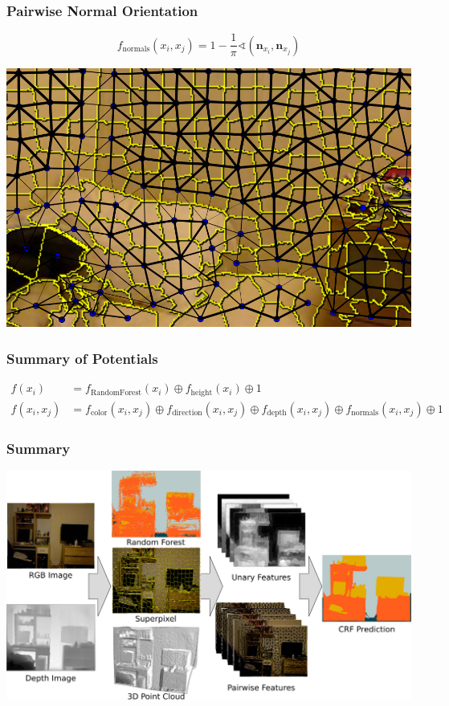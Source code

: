\documentclass[final,ignorenonframetext,compress]{beamer}
\begin{document}
    \begin{frame}
        \frametitle{Pairwise Normal Orientation}
        \[
            f_\text{normals}(x_i, x_j) = 1 - \frac{1}{\pi}\sphericalangle(\mathbf{n}_{x_i}, \mathbf{n}_{x_j})
         \]
        \begin{center}
            \includegraphics[width=.6\linewidth]{images/normal_feature}
        \end{center}
    \end{frame}


    \begin{frame}
        \frametitle{Summary of Potentials}
        \begin{align*}
            f(x_i) &= f_\text{RandomForest}(x_i) \oplus f_\text{height}(x_i) \oplus 1\\
            f(x_i, x_j) &= f_\text{color}(x_i, x_j) \oplus f_\text{direction}(x_i, x_j) \oplus f_\text{depth}(x_i, x_j) \oplus f_\text{normals}(x_i, x_j) \oplus 1
        \end{align*}
        
    \end{frame}

    \begin{frame}
        \frametitle{Summary}
        \begin{center}
            \includegraphics[width=.9\linewidth]{images/teaser}
        \end{center}
    \end{frame}
\end{document}
